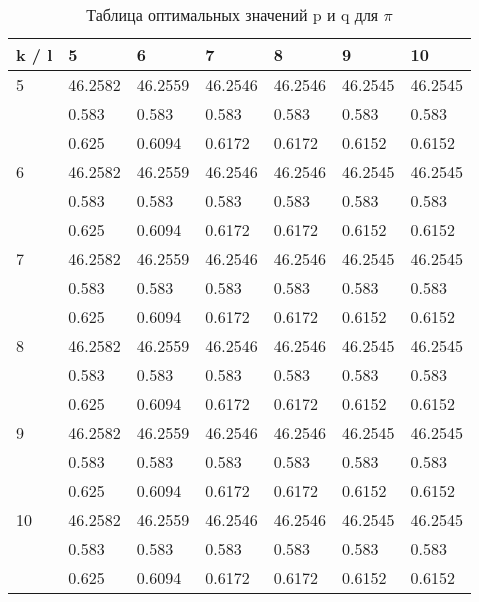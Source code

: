 \documentclass[12pt]{article}
\begin{document}
\begin{table}[h]
	\caption{Таблица оптимальных значений p и q для $\pi$}
	\label{pitable}
	\begin{center}
		\begin{tabular}{|l|l|l|l|l|l|l|}
			\hline
			k / l &5 & 6 & 7 & 8 & 9 & 10\\
			\hline
			5 & 46.2582& 46.2559& 46.2546& 46.2546& 46.2545& 46.2545\\
			& 0.583& 0.583& 0.583& 0.583& 0.583& 0.583\\
			& 0.625& 0.6094& 0.6172& 0.6172& 0.6152& 0.6152\\
			
			\hline
			6 & 46.2582& 46.2559& 46.2546& 46.2546& 46.2545& 46.2545\\
			& 0.583& 0.583& 0.583& 0.583& 0.583& 0.583\\
			& 0.625& 0.6094& 0.6172& 0.6172& 0.6152& 0.6152\\
			\hline
			7 & 46.2582& 46.2559& 46.2546& 46.2546& 46.2545& 46.2545\\
			& 0.583& 0.583& 0.583& 0.583& 0.583& 0.583\\
			& 0.625& 0.6094& 0.6172& 0.6172& 0.6152& 0.6152\\
			\hline
			8 & 46.2582& 46.2559& 46.2546& 46.2546& 46.2545& 46.2545\\
			& 0.583& 0.583& 0.583& 0.583& 0.583& 0.583\\
			& 0.625& 0.6094& 0.6172& 0.6172& 0.6152& 0.6152\\
			\hline
			9 & 46.2582& 46.2559& 46.2546& 46.2546& 46.2545& 46.2545\\
			& 0.583& 0.583& 0.583& 0.583& 0.583& 0.583\\
			& 0.625& 0.6094& 0.6172& 0.6172& 0.6152& 0.6152\\
			\hline
			10 & 46.2582& 46.2559& 46.2546& 46.2546& 46.2545& 46.2545\\
			& 0.583& 0.583& 0.583& 0.583& 0.583& 0.583\\
			& 0.625& 0.6094& 0.6172& 0.6172& 0.6152& 0.6152\\
			\hline
		\end{tabular}
	\end{center}
\end{table}


	
\tableofcontents
\end{document}
